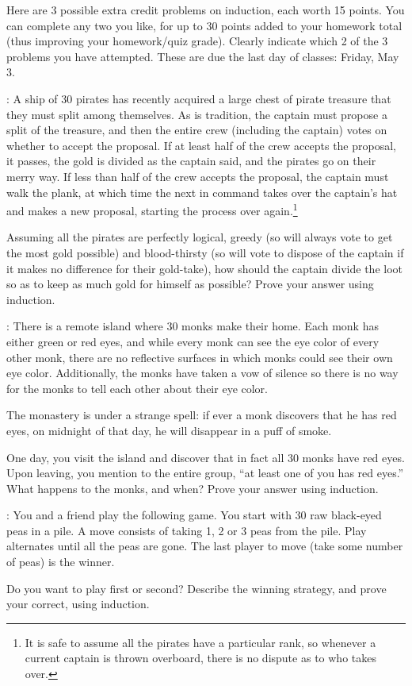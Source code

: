 \documentclass[12pt]{exam}
\begin{document}
 Here are 3 possible extra credit problems on induction, each worth 15 points.  You can complete any two you like, for up to 30 points added to your homework total (thus improving your homework/quiz grade).  Clearly indicate which 2 of the 3 problems you have attempted.  These are due the last day of classes: Friday, May 3.

\begin{questions}
: A ship of 30 pirates has recently acquired a large chest of pirate treasure that they must split among themselves.  As is tradition, the captain must propose a split of the treasure, and then the entire crew (including the captain) votes on whether to accept the proposal.  If at least half of the crew accepts the proposal, it passes, the gold is divided as the captain said, and the pirates go on their merry way.  If less than half of the crew accepts the proposal, the captain must walk the plank, at which time the next in command takes over the captain's hat and makes a new proposal, starting the process over again.\footnote{It is safe to assume all the pirates have a particular rank, so whenever a current captain is thrown overboard, there is no dispute as to who takes over.}

Assuming all the pirates are perfectly logical, greedy (so will always vote to get the most gold possible) and blood-thirsty (so will vote to dispose of the captain if it makes no difference for their gold-take), how should the captain divide the loot so as to keep as much gold for himself as possible?  Prove your answer using induction.


: There is a remote island where 30 monks make their home.  Each monk has either green or red eyes, and while every monk can see the eye color of every other monk, there are no reflective surfaces in which monks could see their own eye color.  Additionally, the monks have taken a vow of silence so there is no way for the monks to tell each other about their eye color. 

The monastery is under a strange spell: if ever a monk discovers that he has red eyes, on midnight of that day, he will disappear in a puff of smoke.

One day, you visit the island and discover that in fact all 30 monks have red eyes.  Upon leaving, you mention to the entire group, ``at least one of you has red eyes.''  What happens to the monks, and when?  Prove your answer using induction.


: You and a friend play the following game.  You start with 30 raw black-eyed peas in a pile.  A move consists of taking 1, 2 or 3 peas from the pile.  Play alternates until all the peas are gone.  The last player to move (take some number of peas) is the winner.

Do you want to play first or second?  Describe the winning strategy, and prove your correct, using induction.

  \end{questions}
\end{document}
